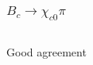 \documentclass{beamer}
\begin{document}
\newcommand{\Br}{\mathrm{Br}}

\begin{frame}
  \frametitle{$B_c \to \chi_{c0} \pi$}
  \begin{columns}
    \begin{column}{0.5\textwidth}
      \centering{[Ebert]:}
      
    \end{column}
    \begin{column}{0.5\textwidth}
      \centering{[Wang]:}
      
    \end{column}
  \end{columns}
  \vspace{2cm}
  Good agreement
\end{frame}

\newcommand{\VSpace}{}
\end{document}
